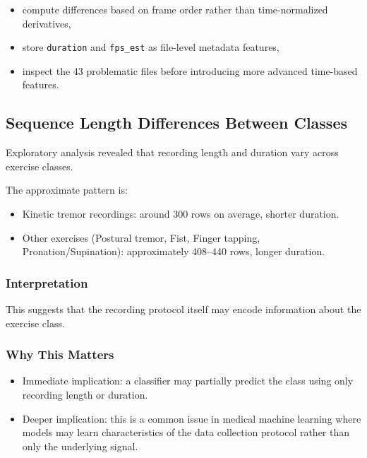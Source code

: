 \documentclass[11pt,twocolumn]{article}
\begin{document}
\begin{itemize}
    \item compute differences based on frame order rather than time-normalized derivatives,
    \item store \texttt{duration} and \texttt{fps\_est} as file-level metadata features,
    \item inspect the 43 problematic files before introducing more advanced time-based features.
\end{itemize}

\subsection{Sequence Length Differences Between Classes}

Exploratory analysis revealed that recording length and duration vary across exercise classes.

The approximate pattern is:

\begin{itemize}
    \item Kinetic tremor recordings: around 300 rows on average, shorter duration.
    \item Other exercises (Postural tremor, Fist, Finger tapping, Pronation/Supination): approximately 408--440 rows, longer duration.
\end{itemize}

\subsubsection{Interpretation}

This suggests that the recording protocol itself may encode information about the exercise class.

\subsubsection{Why This Matters}

\begin{itemize}
    \item Immediate implication: a classifier may partially predict the class using only recording length or duration.
    
    \item Deeper implication: this is a common issue in medical machine learning where models may learn characteristics of the data collection protocol rather than only the underlying signal.
\end{itemize}
\end{document}
